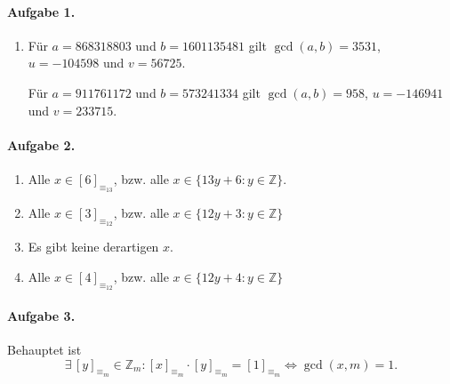 \documentclass{article}
\begin{document}
\paragraph{Aufgabe 1.}

\begin{enumerate}
    \item Für $a = 868318803$ und $b = 1601135481$ gilt $\gcd (a, b) = 3531$, $u = -104598$ und $v = 56725$.
    
    Für $a = 911761172$ und $b = 573241334$ gilt $\gcd (a, b) = 958$, $u = -146941$ und $v = 233715$.
\end{enumerate}

\paragraph{Aufgabe 2.}

\begin{enumerate}

    \item Alle $x \in [6]_{\equiv_{13}}$, bzw. alle $x \in \{ 13y + 6 : y \in \mathbb{Z} \}$.

    \item Alle $x \in [3]_{\equiv_{12}}$, bzw. alle $x \in \{ 12y + 3 : y \in \mathbb{Z} \}$
    
    \item Es gibt keine derartigen $x$.
    
    \item Alle $x \in [4]_{\equiv_{12}}$, bzw. alle $x \in \{ 12y + 4 : y \in \mathbb{Z} \}$
\end{enumerate}

\paragraph{Aufgabe 3.}

Behauptet ist
\begin{equation*}
    \exists\, [y]_{\equiv_{m}} \in \mathbb{Z}_m : [x]_{\equiv_{m}} \cdot [y]_{\equiv_{m}} = [1]_{\equiv_{m}}\Longleftrightarrow \gcd(x, m) = 1.
\end{equation*}
\end{document}
